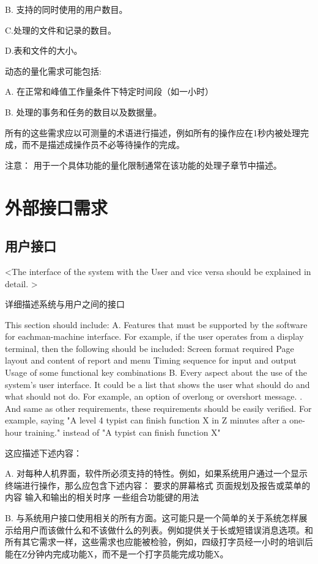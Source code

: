 \begin{itemize}
B. 支持的同时使用的用户数目。

C.处理的文件和记录的数目。

D.表和文件的大小。

动态的量化需求可能包括:

A. 在正常和峰值工作量条件下特定时间段（如一小时）

B. 处理的事务和任务的数目以及数据量。

所有的这些需求应以可测量的术语进行描述，例如所有的操作应在1秒内被处理完成，而不是描述成操作员不必等待操作的完成。

注意： 用于一个具体功能的量化限制通常在该功能的处理子章节中描述。
\section{外部接口需求}
\subsection{用户接口}
<The interface of the system with the User and vice versa should be explained in detail. >

详细描述系统与用户之间的接口

This section should include:
A. Features that must be supported by the software for eachman-machine interface. For example, if the user operates from a display terminal, then the following should be included:
		Screen format required
		Page layout and content of report and menu
		Timing sequence for input and output
		Usage of some functional key combinations
B. Every aspect about the use of the system's user interface. It could be a list that shows the user what should do and what should not do.  For example, an option of overlong or overshort message. . And same as other requirements, these requirements should be easily verified. For example, saying "A level 4 typist can finish function X in Z minutes after a one-hour training." instead of "A typist can finish function X"	

这应描述下述内容：

A. 对每种人机界面，软件所必须支持的特性。例如，如果系统用户通过一个显示终端进行操作，那么应包含下述内容：
要求的屏幕格式
页面规划及报告或菜单的内容
输入和输出的相关时序
一些组合功能键的用法

B. 与系统用户接口使用相关的所有方面。这可能只是一个简单的关于系统怎样展示给用户而该做什么和不该做什么的列表。例如提供关于长或短错误消息选项。和所有其它需求一样，这些需求也应能被检验，例如，四级打字员经一小时的培训后能在Z分钟内完成功能X，而不是一个打字员能完成功能X。


\end{itemize}
